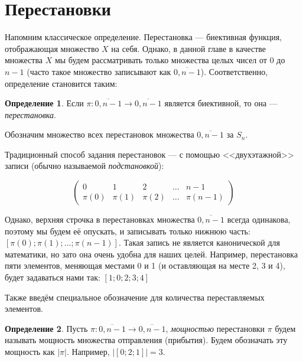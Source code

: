 \documentclass[12pt,a4paper,oneside]{article}
\begin{document}
\theoremstyle{definition}
\newtheorem{definition}{Определение}[section]

\newtheorem{lemma}{Лемма}[section]
\newtheorem{theorem}{Теорема}[section]

\section{Перестановки}

Напомним классическое определение. Перестановка --- биективная функция, отображающая 
множество $X$ на себя.
Однако, в данной главе в качестве множества $X$ мы будем рассматривать только 
множества целых чисел от $0$ до $n-1$ (часто такое множество записывают как
$\overline{0,n-1}$). Соответственно, определение становится таким:

\begin{definition}
Если $\pi: \overline{0,n-1} \rightarrow \overline{0,n-1}$ является биективной,
то она --- \emph{перестановка}.
\end{definition}

\noindent Обозначим множество всех перестановок множества $\overline{0,n-1}$ за $S_n$.

Традиционный способ задания перестановок --- с помощью <<двухэтажной>> записи 
(обычно называемой \emph{подстановкой}):

$$
\left(\begin{array}{ccccc}
0 & 1 & 2 & \dots & n-1\\
\pi(0) & \pi(1) & \pi(2) & \dots & \pi(n-1)
\end{array}\right)
$$

Однако, верхняя строчка в перестановках множества $\overline{0,n-1}$ всегда одинакова, поэтому мы будем её опускать,
и записывать только нижнюю часть: $[\pi(0);\pi(1);\dots;\pi(n-1)]$. Такая запись не является
канонической для математики, но зато она очень удобна для наших целей.
Например, перестановка пяти элементов, меняющая местами 0 и 1 (и оставляющая на месте 2, 3 и 4), 
будет задаваться нами так: $[1;0;2;3;4]$

Также введём специальное обозначение для количества переставляемых элементов.

\begin{definition}
Пусть $\pi: \overline{0,n-1} \rightarrow \overline{0,n-1}$, \emph{мощностью}
перестановки $\pi$ будем называть мощность множества отправления (прибытия).
Будем обозначать эту мощность как $|\pi|$.
Например, $|[0;2;1]| = 3$. 
\end{definition}
\end{document}
